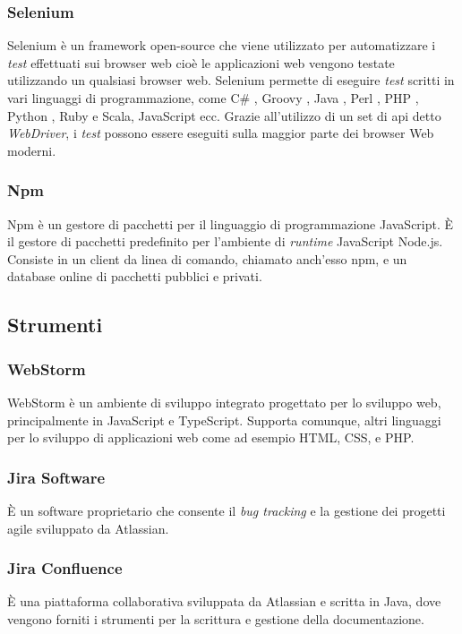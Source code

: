 \subsubsection*{Selenium}
Selenium è un \gls{framework}\ap{[g]} \gls{open-source}\ap{[g]} che viene utilizzato per automatizzare i \emph{test} effettuati sui \gls{browser web}\ap{[g]} cioè le applicazioni web vengono testate utilizzando un qualsiasi \gls{browser web}\ap{[g]}. Selenium permette di eseguire \emph{test} scritti in vari linguaggi di programmazione, come C\# , Groovy , Java , Perl , \gls{PHP} , Python , Ruby e Scala, JavaScript ecc. Grazie all'utilizzo di un set di \gls{api}\ap{[g]} detto \emph{WebDriver}, i \emph{test} possono essere eseguiti sulla maggior parte dei browser Web moderni.

\subsubsection*{Npm}
Npm è un gestore di pacchetti per il linguaggio di programmazione JavaScript. È il gestore di pacchetti predefinito per l'ambiente di \emph{runtime} JavaScript Node.js. Consiste in un \gls{client}\ap{[g]} da linea di comando, chiamato anch'esso npm, e un \gls{database}\ap{[g]} online di pacchetti pubblici e privati.

\subsection{Strumenti}

\subsubsection*{WebStorm}
WebStorm è un ambiente di sviluppo integrato progettato per lo sviluppo web, principalmente in JavaScript e TypeScript. Supporta comunque, altri linguaggi per lo sviluppo di applicazioni web come ad esempio \gls{HTML}, \gls{CSS}, e \gls{PHP}.

\subsubsection{Jira Software}
È un software proprietario che consente il \emph{bug tracking} e la gestione dei progetti agile sviluppato da Atlassian.

\subsubsection{Jira Confluence}
È una piattaforma collaborativa sviluppata da Atlassian e scritta in Java, dove vengono forniti i strumenti per la scrittura e gestione della documentazione.


